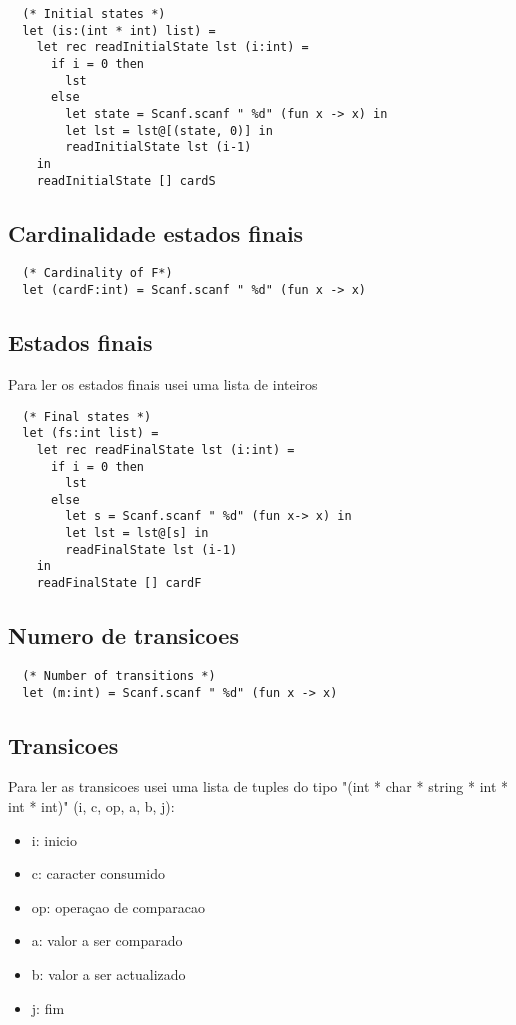 \documentclass[11pt]{article}
\begin{document}
\begin{verbatim}
  (* Initial states *)
  let (is:(int * int) list) =
    let rec readInitialState lst (i:int) =
      if i = 0 then
        lst
      else
        let state = Scanf.scanf " %d" (fun x -> x) in
        let lst = lst@[(state, 0)] in
        readInitialState lst (i-1)
    in
    readInitialState [] cardS
\end{verbatim}
\subsection{Cardinalidade estados finais}
\label{sec:org64468e1}
\begin{verbatim}
  (* Cardinality of F*)
  let (cardF:int) = Scanf.scanf " %d" (fun x -> x)
\end{verbatim}
\pagebreak{}
\subsection{Estados finais}
\label{sec:org77d65f5}
Para ler os estados finais usei uma lista de inteiros
\begin{verbatim}
  (* Final states *)
  let (fs:int list) =
    let rec readFinalState lst (i:int) =
      if i = 0 then
        lst
      else
        let s = Scanf.scanf " %d" (fun x-> x) in
        let lst = lst@[s] in
        readFinalState lst (i-1)
    in
    readFinalState [] cardF
\end{verbatim}
\subsection{Numero de transicoes}
\label{sec:orgab8118c}
\begin{verbatim}
  (* Number of transitions *)
  let (m:int) = Scanf.scanf " %d" (fun x -> x)
\end{verbatim}
\pagebreak{}
\subsection{Transicoes}
\label{sec:orgd974cab}
Para ler as transicoes usei uma lista de tuples do tipo "(int * char * string * int * int * int)" (i, c, op, a, b, j):
\begin{itemize}
\item i: inicio
\item c: caracter consumido
\item op: operaçao de comparacao
\item a: valor a ser comparado
\item b: valor a ser actualizado
\item j: fim
\end{itemize}
\end{document}
